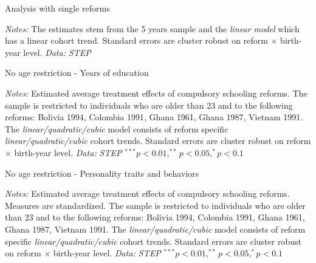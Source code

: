 \begin{table}[htbp]
	\caption{Analysis with single reforms}
	\label{tab:single_reforms}
	\centering
	\begin{threeparttable}
		\footnotesize
		
		\begin{tablenotes}
			\footnotesize
			\item \textit{Notes:} The estimates stem from the 5 years sample and the \textit{linear model} which has a linear cohort trend. Standard errors are cluster robust on reform $\times$ birth-year level. \textit{Data: STEP}
		\end{tablenotes}
	\end{threeparttable}
\end{table}


\begin{table}[htbp]
	\caption{No age restriction - Years of education}
	\label{tab:all_age_educ}
	\centering
	\begin{threeparttable}
		\footnotesize
		
		\begin{tablenotes}
			\footnotesize
			\item \textit{Notes:} Estimated average treatment effects of compulsory schooling reforms. The sample is restricted to individuals who are older than 23 and to the following reforms: Bolivia 1994, Colombia 1991, Ghana 1961, Ghana 1987, Vietnam 1991. The \textit{linear/quadratic/cubic} model consists of reform specific \textit{linear/quadratic/cubic} cohort trends. Standard errors are cluster robust on reform $\times$ birth-year level. \textit{Data: STEP} $^{***} p < 0.01, ^{**} p < 0.05, ^{*} p < 0.1$
		\end{tablenotes}
	\end{threeparttable}
\end{table}

\begin{table}[htbp]
	\caption{No age restriction - Personality traits and behaviors}
	\label{tab:all_age_ncogn}
	\centering
	\begin{threeparttable}
		\footnotesize
		
		\begin{tablenotes}
			\footnotesize
			\item \textit{Notes:} Estimated average treatment effects of compulsory schooling reforms. Measures are standardized. The sample is restricted to individuals who are older than 23 and to the following reforms: Bolivia 1994, Colombia 1991, Ghana 1961, Ghana 1987, Vietnam 1991. The \textit{linear/quadratic/cubic} model consists of reform specific \textit{linear/quadratic/cubic} cohort trends. Standard errors are cluster robust on reform $\times$ birth-year level. \textit{Data: STEP} $^{***} p < 0.01, ^{**} p < 0.05, ^{*} p < 0.1$
		\end{tablenotes}
	\end{threeparttable}
\end{table}

